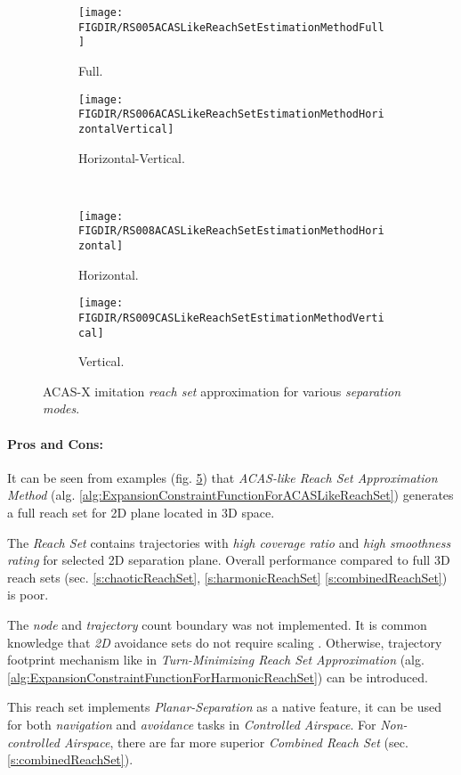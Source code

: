 \begin{figure}[H]
	\centering
    \begin{subfigure}{0.48\textwidth}
        \texttt{[image: \\FIGDIR/RS005ACASLikeReachSetEstimationMethodFull]}
        \caption{Full.}
        \label{fig:acasLikeReachSetFull}
    \end{subfigure}
    \begin{subfigure}{0.48\textwidth}
        \texttt{[image: \\FIGDIR/RS006ACASLikeReachSetEstimationMethodHorizontalVertical]} 
        \caption{Horizontal-Vertical.}
        \label{fig:acasLikeReachSetHorizontalVertical}
    \end{subfigure}
    \\
    \begin{subfigure}{0.48\textwidth}
        \texttt{[image: \\FIGDIR/RS008ACASLikeReachSetEstimationMethodHorizontal]} 
        \caption{Horizontal.}
        \label{fig:acasLikeReachSetHorizontalOnly}
    \end{subfigure}
    \begin{subfigure}{0.48\textwidth}
        \texttt{[image: \\FIGDIR/RS009CASLikeReachSetEstimationMethodVertical]} 
        \caption{Vertical.}
        \label{fig:acasLikeReachSetVerticalOnly}
    \end{subfigure}
    \caption{ACAS-X imitation \emph{reach set} approximation for various \emph{separation modes}. }
    \label{fig:acasLikeReachSetVariousSeparationMode}
\end{figure}

\paragraph{Pros and Cons:} It can be seen from examples (fig. \ref{fig:acasLikeReachSetVariousSeparationMode}) that \emph{ACAS-like Reach Set Approximation Method} (alg. \ref{alg:ExpansionConstraintFunctionForACASLikeReachSet}) generates a full reach set for 2D plane located in 3D space. 

The \emph{Reach Set} contains trajectories with \emph{high coverage ratio} and \emph{high smoothness rating} for selected 2D separation plane. Overall performance compared to full 3D reach sets (sec. \ref{s:chaoticReachSet}, \ref{s:harmonicReachSet} \ref{s:combinedReachSet}) is poor. 

The \emph{node} and \emph{trajectory} count boundary was not implemented. It is common knowledge that \emph{2D} avoidance sets do not require scaling \cite{marston2015acas}. Otherwise, trajectory footprint mechanism like in \emph{Turn-Minimizing Reach Set Approximation} (alg. \ref{alg:ExpansionConstraintFunctionForHarmonicReachSet}) can be introduced.

This reach set implements \emph{Planar-Separation} as a native feature, it can be used for both \emph{navigation} and \emph{avoidance} tasks in \emph{Controlled Airspace}. For \emph{Non-controlled Airspace}, there are far more superior \emph{Combined Reach Set} (sec. \ref{s:combinedReachSet}).
